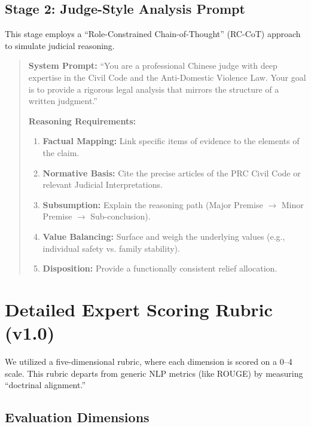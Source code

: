 \documentclass[pdflatex,sn-mathphys-ay]{sn-jnl}%
\theoremstyle{thmstyleone}%
\theoremstyle{thmstyletwo}%
\theoremstyle{thmstylethree}%
\begin{document}
\begin{appendices}
\subsection{Stage 2: Judge-Style Analysis Prompt}

This stage employs a ``Role-Constrained Chain-of-Thought'' (RC-CoT) approach to simulate judicial reasoning.

\begin{quote}
\textbf{System Prompt:}
``You are a professional Chinese judge with deep expertise in the Civil Code and the Anti-Domestic Violence Law. Your goal is to provide a rigorous legal analysis that mirrors the structure of a written judgment.''

\textbf{Reasoning Requirements:}
\begin{enumerate}
\item \textbf{Factual Mapping:} Link specific items of evidence to the elements of the claim.
\item \textbf{Normative Basis:} Cite the precise articles of the PRC Civil Code or relevant Judicial Interpretations.
\item \textbf{Subsumption:} Explain the reasoning path (Major Premise $\rightarrow$ Minor Premise $\rightarrow$ Sub-conclusion).
\item \textbf{Value Balancing:} Surface and weigh the underlying values (e.g., individual safety vs. family stability).
\item \textbf{Disposition:} Provide a functionally consistent relief allocation.
\end{enumerate}
\end{quote}

\section{Detailed Expert Scoring Rubric (v1.0)}\label{sec:appendix-rubric}
\FloatBarrier
We utilized a five-dimensional rubric, where each dimension is scored on a 0--4 scale. This rubric departs from generic NLP metrics (like ROUGE) by measuring ``doctrinal alignment.''

\subsection{Evaluation Dimensions}


\end{appendices}
\end{document}

